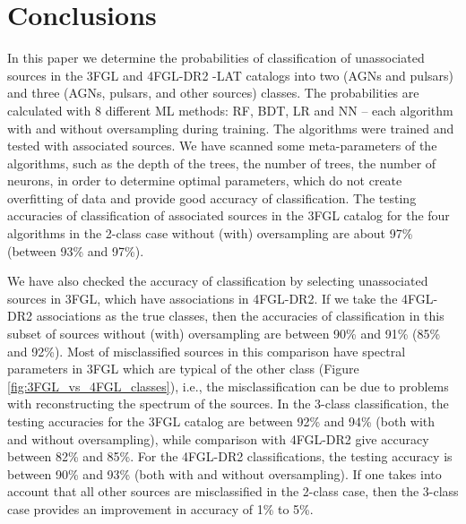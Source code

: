 \section{Conclusions}

In this paper we determine the probabilities of classification of unassociated sources in the 3FGL and 4FGL-DR2 \Fermi-LAT catalogs
into two (AGNs and pulsars) and three (AGNs, pulsars, and other sources) classes.
The probabilities are calculated with 8 different ML methods: RF, BDT, LR and NN -- each algorithm with and without oversampling during training.
The algorithms were trained and tested with associated sources.
We have scanned some meta-parameters of the algorithms, such as the depth of the trees, the number of trees, the number of neurons, in order to determine optimal parameters, which do not create overfitting of data and provide good accuracy of classification.
The testing accuracies of classification of associated sources in the 3FGL catalog for the four algorithms in the 2-class case without (with) oversampling are about  97\% (between 93\% and 97\%).

We have also checked the accuracy of classification by selecting unassociated sources in 3FGL, which have associations in 4FGL-DR2.
If we take the 4FGL-DR2 associations as the true classes, then the accuracies of classification in this subset of sources 
without (with) oversampling are between 90\% and 91\% (85\% and 92\%).
Most of misclassified sources in this comparison have spectral parameters in 3FGL which are typical of the other class (Figure \ref{fig:3FGL_vs_4FGL_classes}), i.e.,  the misclassification can be due to problems with reconstructing the spectrum of the sources.
In the 3-class classification, the testing accuracies for the 3FGL catalog are between 92\% and 94\% (both with and without oversampling), while comparison with 4FGL-DR2 give accuracy between 82\% and 85\%. For the 4FGL-DR2 classifications, the testing accuracy is between 90\% and 93\% (both with and without oversampling). If one takes into account that all other sources are misclassified in the 2-class case, then the 3-class case provides an improvement in accuracy of 1\% to 5\%.

